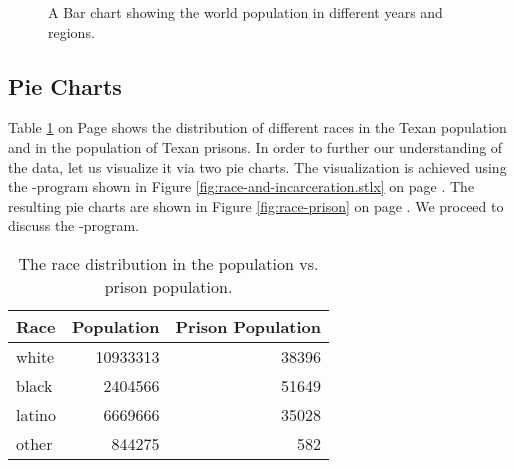 \begin{figure}[!ht]
  \centering
  \caption{A Bar chart showing the world population in different years and regions.}
  \label{fig:world-population.eps}
\end{figure}

\subsection{Pie Charts}
Table \ref{tab:race-prison} on Page \pageref{tab:race-prison} shows the distribution of
different races in the Texan population and in  the population of Texan prisons.  In order to
further our understanding of the data, let us visualize it via two pie charts.  The visualization is
achieved using the \setlx-program shown in Figure \ref{fig:race-and-incarceration.stlx} on page
\pageref{fig:race-and-incarceration.stlx}.  The resulting pie charts are shown in Figure 
\ref{fig:race-prison} on page \pageref{fig:race-prison}.  We proceed to discuss the \setlx-program.


\begin{table}[!hb]
  \centering
  \begin{tabular}{|l|r|r|}
    \hline
    Race  & Population & Prison Population \\
    \hline
    \hline
     white & 10933313 & 38396 \\
    \hline
    black  &  2404566 & 51649 \\
    \hline
    latino &  6669666 & 35028 \\
    \hline
    other  &   844275 &   582 \\
    \hline
  \end{tabular}
  \caption{The race distribution in the population vs. prison population.}
  \label{tab:race-prison}
\end{table}

